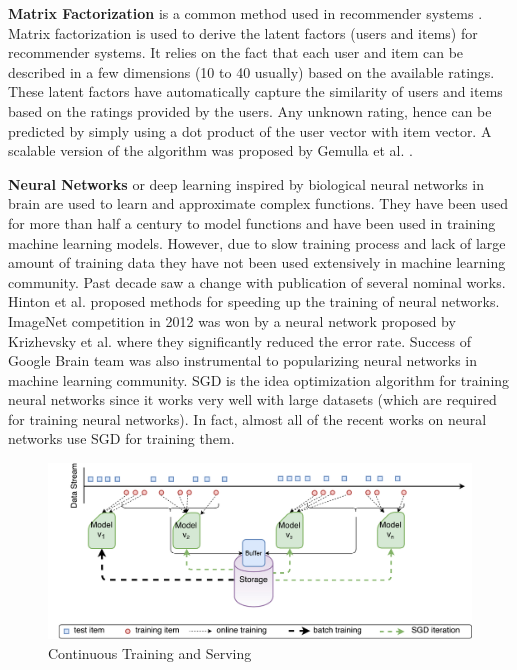 \documentclass{vldb}
\begin{document}
\textbf{Matrix Factorization} is a common method used in recommender systems \cite{koren2009matrix}. 
Matrix factorization is used to derive the latent factors (users and items) for recommender systems.
It relies on the fact that each user and item can be described in a few dimensions (10 to 40 usually) based on the available ratings.
These latent factors have automatically capture the similarity of users and items based on the ratings provided by the users.
Any unknown rating, hence can be predicted by simply using a dot product of the user vector with item vector.
A scalable version of the algorithm was proposed by Gemulla et al. \cite{gemulla2011large}.

\textbf{Neural Networks} or deep learning inspired by biological neural networks in brain are used to learn and approximate complex functions. 
They have been used for more than half a century to model functions and have been used in training machine learning models.
However, due to slow training process and lack of large amount of training data they have not been used extensively in machine learning community.
Past decade saw a change with publication of several nominal works.
Hinton et al. \cite{hinton2006fast} proposed methods for speeding up the training of neural networks.
ImageNet competition \cite{ILSVRC15} in 2012 was won by a neural network proposed by Krizhevsky et al. \cite{krizhevsky2012imagenet} where they significantly reduced the error rate. 
Success of Google Brain team \cite{sutskever2014sequence, mikolov2013efficient} was also instrumental to popularizing neural networks in machine learning community.
SGD is the idea optimization algorithm for training neural networks since it works very well with large datasets (which are required for training neural networks).
In fact, almost all of the recent works on neural networks use SGD for training them.
\begin{figure}[t]
\centering
\includegraphics[scale = 0.5]{../images/continuous-1.pdf}
\caption{Continuous Training and Serving}
\label{fig:cont-training-serving}
\end{figure}
\end{document}
